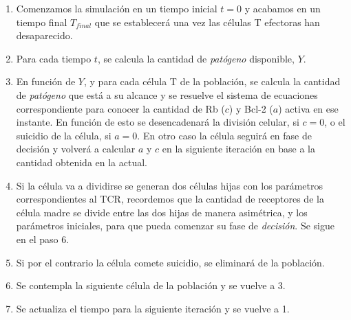\begin{enumerate}
	\item Comenzamos la simulación en un tiempo inicial $t=0$ y acabamos en un tiempo final $T_{final}$ que se establecerá una vez las células T efectoras han desaparecido. 
	
	\item Para cada tiempo $t$, se calcula la cantidad de \textit{patógeno} disponible, $Y$. 
	
	\item En función de $Y$, y para cada célula T de la población, se calcula la cantidad de \textit{patógeno} que está a su alcance y se resuelve el sistema de ecuaciones correspondiente para conocer la cantidad de Rb ($c$) y Bcl-2 ($a$) activa en ese instante. En función de esto se desencadenará la división celular, si $c = 0$, o el suicidio de la célula, si $a = 0$. En otro caso la célula seguirá en fase de decisión y volverá a calcular $a$ y $c$ en la siguiente iteración en base a la cantidad obtenida en la actual.
	
	\item Si la célula va a dividirse se generan dos células hijas con los parámetros correspondientes al TCR, recordemos que la cantidad de receptores de la célula madre se divide entre las dos hijas de manera asimétrica, y los parámetros iniciales, para que pueda comenzar su fase de \textit{decisión}. Se sigue en el paso 6.
	
	\item Si por el contrario la célula comete suicidio, se eliminará de la población. 

	\item Se contempla la siguiente célula de la población y se vuelve a 3.
	
	\item Se actualiza el tiempo para la siguiente iteración y se vuelve a 1.
\end{enumerate}


